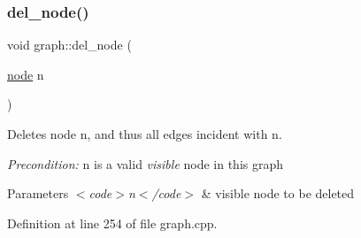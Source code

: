 \subsubsection{\texorpdfstring{del\+\_\+node()}{del\_node()}}
{\footnotesize\ttfamily void graph\+::del\+\_\+node (\begin{DoxyParamCaption}\item[{\mbox{\hyperlink{classnode}{node}}}]{n }\end{DoxyParamCaption})}

Deletes node {\ttfamily n}, and thus all edges incident with {\ttfamily n}.

{\itshape Precondition\+:} {\ttfamily n} is a valid {\itshape visible} node in this graph


\begin{DoxyParams}{Parameters}
{\em $<$code$>$n$<$/code$>$} & visible node to be deleted \\
\hline
\end{DoxyParams}


Definition at line 254 of file graph.\+cpp.


